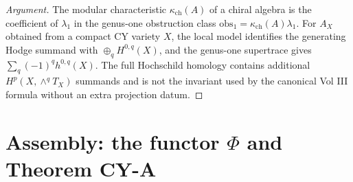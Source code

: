 \documentclass[11pt]{article}
\theoremstyle{plain}
\theoremstyle{definition}
\theoremstyle{remark}
\begin{document}
\begin{proof}[Argument]
The modular characteristic $\kappa_{\mathrm{ch}}(A)$ of a chiral algebra
is the coefficient of $\lambda_1$ in the genus-one obstruction class
$\mathrm{obs}_1 = \kappa_{\mathrm{ch}}(A) \lambda_1$. For
$A_X$ obtained from a compact CY variety $X$, the local model identifies
the generating Hodge summand with $\oplus_q H^{0,q}(X)$, and the
genus-one supertrace gives $\sum_q (-1)^q h^{0,q}(X)$. The full
Hochschild homology contains additional $H^p(X,\wedge^q T_X)$ summands
and is not the invariant used by the canonical Vol III formula without
an extra projection datum.
\end{proof}


\section{Assembly: the functor $\Phi$ and Theorem CY-A}
\label{sec:assembly}
\end{document}
